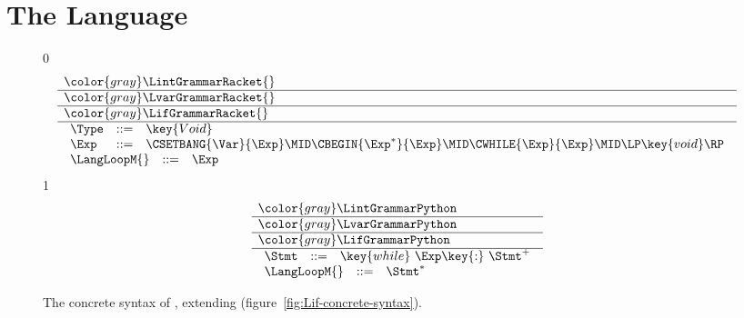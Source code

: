 \documentclass[7x10]{TimesAPriori_MIT}%
\newcommand{\gray}[1]{{\color{gray} #1}}
\def\racketEd{0}
\def\pythonEd{1}
\def\edition{0}
\numberwithin{theorem}{chapter}
\numberwithin{definition}{chapter}
\numberwithin{equation}{chapter}
\begin{document}
\section{The \LangLoop{} Language}

\newcommand{\LwhileGrammarRacket}{
  \begin{array}{lcl}
   \Type &::=& \key{Void}\\
   \Exp &::=& \CSETBANG{\Var}{\Exp}
      \MID \CBEGIN{\Exp^{*}}{\Exp}
      \MID \CWHILE{\Exp}{\Exp} \MID \LP\key{void}\RP 
  \end{array}
}
\newcommand{\LwhileASTRacket}{
\begin{array}{lcl}
  \Type &::=& \key{Void}\\
  \Exp &::=& \SETBANG{\Var}{\Exp}
       \MID \BEGIN{\Exp^{*}}{\Exp}
       \MID \WHILE{\Exp}{\Exp}
       \MID \VOID{}  
\end{array}
}

\newcommand{\LwhileGrammarPython}{
\begin{array}{rcl}
  \Stmt &::=& \key{while}~ \Exp \key{:}~ \Stmt^{+}
\end{array}
}
\newcommand{\LwhileASTPython}{
\begin{array}{lcl}
\Stmt{} &::=& \WHILESTMT{\Exp}{\Stmt^{+}}
\end{array}
}

\begin{figure}[tp]
\centering
\begin{tcolorbox}[colback=white]
    \small
{\if\edition\racketEd    
\[
\begin{array}{l}
  \gray{\LintGrammarRacket{}} \\ \hline
  \gray{\LvarGrammarRacket{}} \\ \hline
  \gray{\LifGrammarRacket{}} \\ \hline
  \LwhileGrammarRacket \\
  \begin{array}{lcl}
  \LangLoopM{} &::=& \Exp
\end{array}
\end{array}
\]
\fi}
{\if\edition\pythonEd
\[
\begin{array}{l}
  \gray{\LintGrammarPython} \\ \hline
  \gray{\LvarGrammarPython}  \\ \hline
  \gray{\LifGrammarPython} \\ \hline
  \LwhileGrammarPython \\
\begin{array}{rcl}
  \LangLoopM{} &::=& \Stmt^{*}
\end{array}
\end{array}
\]
\fi}
\end{tcolorbox}

\caption{The concrete syntax of \LangLoop{}, extending \LangIf{} (figure~\ref{fig:Lif-concrete-syntax}).}
\label{fig:Lwhile-concrete-syntax}
\end{figure}
\end{document}
